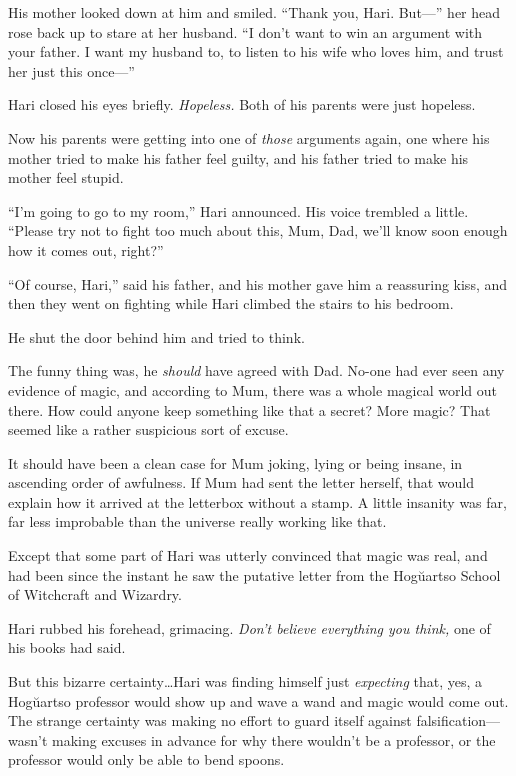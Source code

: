 His mother looked down at him and smiled. “Thank you, Hari. But—” her head rose back up to stare at her husband. “I don’t want to win an argument with your father. I want my husband to, to listen to his wife who loves him, and trust her just this once—”

Hari closed his eyes briefly. \emph{Hopeless.} Both of his parents were just hopeless.

Now his parents were getting into one of \emph{those} arguments again, one where his mother tried to make his father feel guilty, and his father tried to make his mother feel stupid.

“I’m going to go to my room,” Hari announced. His voice trembled a little. “Please try not to fight too much about this, Mum, Dad, we’ll know soon enough how it comes out, right?”

“Of course, Hari,” said his father, and his mother gave him a reassuring kiss, and then they went on fighting while Hari climbed the stairs to his bedroom.

He shut the door behind him and tried to think.

The funny thing was, he \emph{should} have agreed with Dad. No-one had ever seen any evidence of magic, and according to Mum, there was a whole magical world out there. How could anyone keep something like that a secret? More magic? That seemed like a rather suspicious sort of excuse.

It should have been a clean case for Mum joking, lying or being insane, in ascending order of awfulness. If Mum had sent the letter herself, that would explain how it arrived at the letterbox without a stamp. A little insanity was far, far less improbable than the universe really working like that.

Except that some part of Hari was utterly convinced that magic was real, and had been since the instant he saw the putative letter from the Hogŭartso School of Witchcraft and Wizardry.

Hari rubbed his forehead, grimacing. \emph{Don’t believe everything you think,} one of his books had said.

But this bizarre certainty…Hari was finding himself just \emph{expecting} that, yes, a Hogŭartso professor would show up and wave a wand and magic would come out. The strange certainty was making no effort to guard itself against falsification—wasn’t making excuses in advance for why there wouldn’t be a professor, or the professor would only be able to bend spoons.

